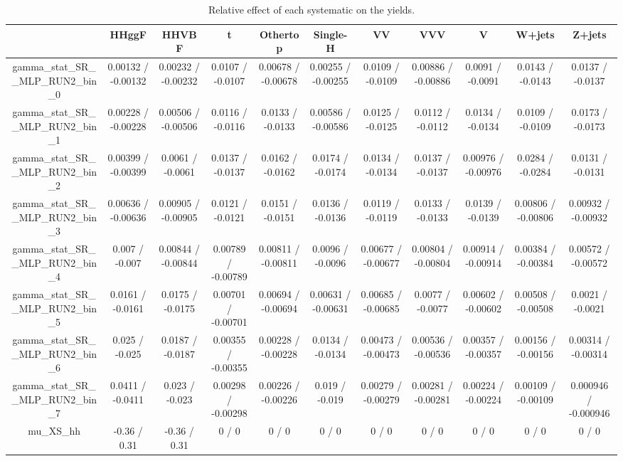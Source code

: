 \documentclass[10pt]{article}
\begin{document}
\begin{table}[htbp]
\begin{center}
\begin{tabular}{|c|c|c|c|c|c|c|c|c|c|c|}
\hline 
      & HHggF      & HHVBF      & t      & Othertop      & Single-H      & VV      & VVV      & V      & W+jets      & Z+jets \\ 
\hline 
  gamma_stat_SR__MLP_RUN2_bin_0 & 0.00132 / -0.00132 & 0.00232 / -0.00232 & 0.0107 / -0.0107 & 0.00678 / -0.00678 & 0.00255 / -0.00255 & 0.0109 / -0.0109 & 0.00886 / -0.00886 & 0.0091 / -0.0091 & 0.0143 / -0.0143 & 0.0137 / -0.0137 \\ 
  gamma_stat_SR__MLP_RUN2_bin_1 & 0.00228 / -0.00228 & 0.00506 / -0.00506 & 0.0116 / -0.0116 & 0.0133 / -0.0133 & 0.00586 / -0.00586 & 0.0125 / -0.0125 & 0.0112 / -0.0112 & 0.0134 / -0.0134 & 0.0109 / -0.0109 & 0.0173 / -0.0173 \\ 
  gamma_stat_SR__MLP_RUN2_bin_2 & 0.00399 / -0.00399 & 0.0061 / -0.0061 & 0.0137 / -0.0137 & 0.0162 / -0.0162 & 0.0174 / -0.0174 & 0.0134 / -0.0134 & 0.0137 / -0.0137 & 0.00976 / -0.00976 & 0.0284 / -0.0284 & 0.0131 / -0.0131 \\ 
  gamma_stat_SR__MLP_RUN2_bin_3 & 0.00636 / -0.00636 & 0.00905 / -0.00905 & 0.0121 / -0.0121 & 0.0151 / -0.0151 & 0.0136 / -0.0136 & 0.0119 / -0.0119 & 0.0133 / -0.0133 & 0.0139 / -0.0139 & 0.00806 / -0.00806 & 0.00932 / -0.00932 \\ 
  gamma_stat_SR__MLP_RUN2_bin_4 & 0.007 / -0.007 & 0.00844 / -0.00844 & 0.00789 / -0.00789 & 0.00811 / -0.00811 & 0.0096 / -0.0096 & 0.00677 / -0.00677 & 0.00804 / -0.00804 & 0.00914 / -0.00914 & 0.00384 / -0.00384 & 0.00572 / -0.00572 \\ 
  gamma_stat_SR__MLP_RUN2_bin_5 & 0.0161 / -0.0161 & 0.0175 / -0.0175 & 0.00701 / -0.00701 & 0.00694 / -0.00694 & 0.00631 / -0.00631 & 0.00685 / -0.00685 & 0.0077 / -0.0077 & 0.00602 / -0.00602 & 0.00508 / -0.00508 & 0.0021 / -0.0021 \\ 
  gamma_stat_SR__MLP_RUN2_bin_6 & 0.025 / -0.025 & 0.0187 / -0.0187 & 0.00355 / -0.00355 & 0.00228 / -0.00228 & 0.0134 / -0.0134 & 0.00473 / -0.00473 & 0.00536 / -0.00536 & 0.00357 / -0.00357 & 0.00156 / -0.00156 & 0.00314 / -0.00314 \\ 
  gamma_stat_SR__MLP_RUN2_bin_7 & 0.0411 / -0.0411 & 0.023 / -0.023 & 0.00298 / -0.00298 & 0.00226 / -0.00226 & 0.019 / -0.019 & 0.00279 / -0.00279 & 0.00281 / -0.00281 & 0.00224 / -0.00224 & 0.00109 / -0.00109 & 0.000946 / -0.000946 \\ 
  mu_XS_hh & -0.36 / 0.31 & -0.36 / 0.31 & 0 / 0 & 0 / 0 & 0 / 0 & 0 / 0 & 0 / 0 & 0 / 0 & 0 / 0 & 0 / 0 \\ 
\hline 
\end{tabular} 
\caption{Relative effect of each systematic on the yields.} 
\end{center} 
\end{table} 
\end{document}
